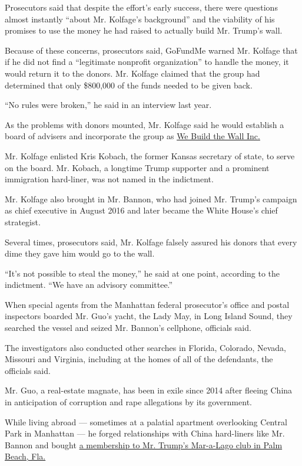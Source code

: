 Prosecutors said that despite the effort's early success, there were
questions almost instantly ``about Mr. Kolfage's background'' and the
viability of his promises to use the money he had raised to actually
build Mr. Trump's wall.

Because of these concerns, prosecutors said, GoFundMe warned Mr. Kolfage
that if he did not find a ``legitimate nonprofit organization'' to
handle the money, it would return it to the donors. Mr. Kolfage claimed
that the group had determined that only \$800,000 of the funds needed to
be given back.

``No rules were broken,'' he said in an interview last year.

As the problems with donors mounted, Mr. Kolfage said he would establish
a board of advisers and incorporate the group as
\href{https://webuildthewall.us/team/}{We Build the Wall Inc.}

Mr. Kolfage enlisted Kris Kobach, the former Kansas secretary of state,
to serve on the board. Mr. Kobach, a longtime Trump supporter and a
prominent immigration hard-liner, was not named in the indictment.

Mr. Kolfage also brought in Mr. Bannon, who had joined Mr. Trump's
campaign as chief executive in August 2016 and later became the White
House's chief strategist.

Several times, prosecutors said, Mr. Kolfage falsely assured his donors
that every dime they gave him would go to the wall.

``It's not possible to steal the money,'' he said at one point,
according to the indictment. ``We have an advisory committee.''

When special agents from the Manhattan federal prosecutor's office and
postal inspectors boarded Mr. Guo's yacht, the Lady May, in Long Island
Sound, they searched the vessel and seized Mr. Bannon's cellphone,
officials said.

The investigators also conducted other searches in Florida, Colorado,
Nevada, Missouri and Virginia, including at the homes of all of the
defendants, the officials said.

Mr. Guo, a real-estate magnate, has been in exile since 2014 after
fleeing China in anticipation of corruption and rape allegations by its
government.

While living abroad --- sometimes at a palatial apartment overlooking
Central Park in Manhattan --- he forged relationships with China
hard-liners like Mr. Bannon and bought
\href{https://www.wsj.com/articles/chinese-tycoon-holed-up-in-manhattan-hotel-is-accused-of-spying-for-beijing-11563810726}{a
membership to Mr. Trump's Mar-a-Lago club in Palm Beach, Fla.}

